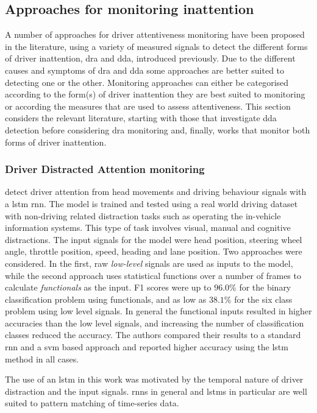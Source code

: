 \documentclass[11pt, parskip=half*,twoside=false]{scrbook}
\begin{document}
\subsection{Approaches for monitoring inattention} \label{ssec:approaches}
A number of approaches for driver attentiveness monitoring have been proposed in the literature, using a variety of measured signals to detect the different forms of driver inattention, \gls{dra} and \gls{dda}, introduced previously. Due to the different causes and symptoms of \gls{dra} and \gls{dda} some approaches are better suited to detecting one or the other. Monitoring approaches can either be categorised according to the form(s) of driver inattention they are best suited to monitoring or according the measures that are used to assess attentiveness. This section considers the relevant literature, starting with those that investigate \gls{dda} detection before considering \gls{dra} monitoring and, finally, works that monitor both forms of driver inattention. 

\subsubsection{Driver Distracted Attention monitoring}
\citet{wollmerOnlineDriverDistraction2011} detect driver attention from head movements and driving behaviour signals with a \gls{lstm} \gls{rnn}. The model is trained and tested using a real world driving dataset with non-driving related distraction tasks such as operating the in-vehicle information systems. This type of task involves visual, manual and cognitive distractions. The input signals for the model were head position, steering wheel angle, throttle position, speed, heading and lane position. Two approaches were considered. In the first, raw \emph{low-level} signals are used as inputs to the model, while the second approach uses statistical functions over a number of frames to calculate \emph{functionals} as the input. F1 scores were up to $96.0\%$ for the binary classification problem using functionals, and as low as $38.1\%$ for the six class problem using low level signals. In general the functional inputs resulted in higher accuracies than the low level signals, and increasing the number of classification classes reduced the accuracy. The authors compared their results to a standard \gls{rnn} and a \gls{svm} based approach and reported higher accuracy using the \gls{lstm} method in all cases.

The use of an \gls{lstm} in this work was motivated by the temporal nature of driver distraction and the input signals. \Glspl{rnn} in general and \glspl{lstm} in particular are well suited to pattern matching of time-series data.
\end{document}
